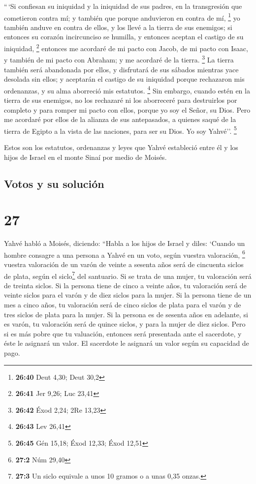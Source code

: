  ``\,`Si confiesan su iniquidad y la iniquidad de sus
padres, en la transgresión que cometieron contra mí; y también que
porque anduvieron en contra de mí, \footnote{\textbf{26:40} Deut 4,30;
  Deut 30,2}  yo también anduve en contra de ellos, y los
llevé a la tierra de sus enemigos; si entonces su corazón incircunciso
se humilla, y entonces aceptan el castigo de su iniquidad, \footnote{\textbf{26:41}
  Jer 9,26; Luc 23,41}  entonces me acordaré de mi pacto
con Jacob, de mi pacto con Isaac, y también de mi pacto con Abraham; y
me acordaré de la tierra. \footnote{\textbf{26:42} Éxod 2,24; 2Re 13,23}
 La tierra también será abandonada por ellos, y
disfrutará de sus sábados mientras yace desolada sin ellos; y aceptarán
el castigo de su iniquidad porque rechazaron mis ordenanzas, y su alma
aborreció mis estatutos. \footnote{\textbf{26:43} Lev 26,41}
 Sin embargo, cuando estén en la tierra de sus enemigos,
no los rechazaré ni los aborreceré para destruirlos por completo y para
romper mi pacto con ellos, porque yo soy el Señor, su Dios.
 Pero me acordaré por ellos de la alianza de sus
antepasados, a quienes saqué de la tierra de Egipto a la vista de las
naciones, para ser su Dios. Yo soy Yahvé''. \footnote{\textbf{26:45} Gén
  15,18; Éxod 12,33; Éxod 12,51}

 Estos son los estatutos, ordenanzas y leyes que Yahvé
estableció entre él y los hijos de Israel en el monte Sinaí por medio de
Moisés.

\hypertarget{votos-y-su-soluciuxf3n}{%
\subsection{Votos y su solución}\label{votos-y-su-soluciuxf3n}}

\hypertarget{section-26}{%
\section{27}\label{section-26}}

 Yahvé habló a Moisés, diciendo:  ``Habla a
los hijos de Israel y diles: `Cuando un hombre consagre a una persona a
Yahvé en un voto, según vuestra valoración, \footnote{\textbf{27:2} Núm
  29,40}  vuestra valoración de un varón de veinte a
sesenta años será de cincuenta siclos de plata, según el
siclo\footnote{\textbf{27:3} Un siclo equivale a unos 10 gramos o a unas
  0,35 onzas.} del santuario.  Si se trata de una mujer,
tu valoración será de treinta siclos.  Si la persona tiene
de cinco a veinte años, tu valoración será de veinte siclos para el
varón y de diez siclos para la mujer.  Si la persona tiene
de un mes a cinco años, tu valoración será de cinco siclos de plata para
el varón y de tres siclos de plata para la mujer.  Si la
persona es de sesenta años en adelante, si es varón, tu valoración será
de quince siclos, y para la mujer de diez siclos.  Pero si
es más pobre que tu valuación, entonces será presentada ante el
sacerdote, y éste le asignará un valor. El sacerdote le asignará un
valor según su capacidad de pago.

